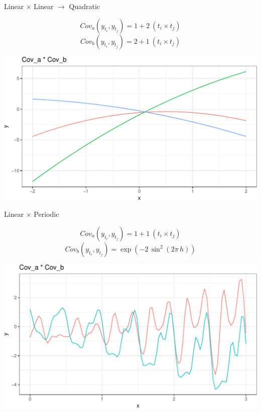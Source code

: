 \documentclass[11pt,ignorenonframetext,]{beamer}
\begin{document}
\begin{frame}[t]{%
\protect\hypertarget{linear-times-linear-to-quadratic}{%
Linear \(\times\) Linear \(\to\) Quadratic}}

\vspace{-5mm}

\[ Cov_a(y_{t_i}, y_{t_j}) = 1 + 2~(t_i \times t_j) \]
\[ Cov_b(y_{t_i}, y_{t_j}) = 2 + 1~(t_i \times t_j) \]

\begin{center}\includegraphics[width=\textwidth]{Lec14_files/figure-beamer/unnamed-chunk-8-1} \end{center}

\end{frame}

\begin{frame}[t]{%
\protect\hypertarget{linear-times-periodic}{%
Linear \(\times\) Periodic}}

\vspace{-5mm}

\[ Cov_a(y_{t_i}, y_{t_j}) = 1 + 1~(t_i \times t_j) \]
\[ Cov_b(y_{t_i}, y_{t_j}) = \exp\left(-2\, \sin^2\left(2\pi\,h\right)\right) \]

\begin{center}\includegraphics[width=\textwidth]{Lec14_files/figure-beamer/unnamed-chunk-9-1} \end{center}

\end{frame}
\end{document}
